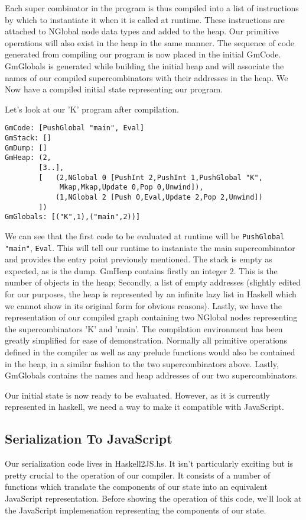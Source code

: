Each super combinator in the program is thus compiled into
a list of instructions by which to instantiate it when it
is called at runtime. These instructions are attached to
NGlobal node data types and added to the heap. Our primitive
operations will also exist in the heap in the same manner.
The sequence of code generated from compiling our program
is now placed in the initial GmCode. GmGlobals is generated
while building the initial heap and will associate the names
of our compiled supercombinators with their addresses in the
heap. We Now have a compiled initial state representing our
program. 

Let's look at our 'K' program after compilation.

\begin{verbatim}
GmCode: [PushGlobal "main", Eval]
GmStack: []
GmDump: []
GmHeap:	(2, 
		[3..],  
		[	(2,NGlobal 0 [PushInt 2,PushInt 1,PushGlobal "K",
			 Mkap,Mkap,Update 0,Pop 0,Unwind]),
			(1,NGlobal 2 [Push 0,Eval,Update 2,Pop 2,Unwind])
		])
GmGlobals: [("K",1),("main",2))]

\end{verbatim}

\noindent We can see that the first code to be evaluated at 
runtime will be 
\verb!PushGlobal! \verb!"main"!, \verb!Eval!. 
This will tell our runtime
to instaniate the main supercombinator and provides the entry
point previously mentioned. The stack is empty as expected,
as is the dump. GmHeap contains firstly an integer 2. This 
is the number of objects in the heap; Secondly, a list of
empty addresses (slightly edited for our purposes, the heap 
is represented by an infinite lazy list in Haskell which we
cannot show in its original form for obvious reasons). Lastly,
we have the representation of our compiled graph containing two
NGlobal nodes representing the supercombinators 'K' and 'main'.
The compilation environment has been greatly simplified for
ease of demonstration. Normally all primitive operations 
defined in the compiler as well as any prelude functions would
also be contained in the heap, in a similar fashion to the
two supercombinators above. Lastly, GmGlobals contains the
names and heap addresses of our two supercombinators.

Our initial state is now ready to be evaluated. However, as
it is currently represented in haskell, we need a way to make
it compatible with JavaScript. 

\subsection{Serialization To JavaScript}
Our serialization code lives in Haskell2JS.hs. It isn't 
particularly exciting but is pretty crucial to the operation
of our compiler. It consists of a number of functions which
translate the components of our state into an equivalent
JavaScript representation. Before showing the operation
of this code, we'll look at the JavaScript implemenation
representing the components of our state.

